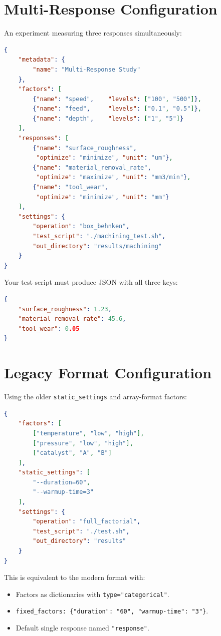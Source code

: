 \documentclass[11pt]{book}
\begin{document}
\section{Multi-Response Configuration}

An experiment measuring three responses simultaneously:

\begin{lstlisting}[language=json]
{
    "metadata": {
        "name": "Multi-Response Study"
    },
    "factors": [
        {"name": "speed",    "levels": ["100", "500"]},
        {"name": "feed",     "levels": ["0.1", "0.5"]},
        {"name": "depth",    "levels": ["1", "5"]}
    ],
    "responses": [
        {"name": "surface_roughness",
         "optimize": "minimize", "unit": "um"},
        {"name": "material_removal_rate",
         "optimize": "maximize", "unit": "mm3/min"},
        {"name": "tool_wear",
         "optimize": "minimize", "unit": "mm"}
    ],
    "settings": {
        "operation": "box_behnken",
        "test_script": "./machining_test.sh",
        "out_directory": "results/machining"
    }
}
\end{lstlisting}

Your test script must produce JSON with all three keys:

\begin{lstlisting}[language=json]
{
    "surface_roughness": 1.23,
    "material_removal_rate": 45.6,
    "tool_wear": 0.05
}
\end{lstlisting}

\section{Legacy Format Configuration}

Using the older \texttt{static\_settings} and array-format factors:

\begin{lstlisting}[language=json]
{
    "factors": [
        ["temperature", "low", "high"],
        ["pressure", "low", "high"],
        ["catalyst", "A", "B"]
    ],
    "static_settings": [
        "--duration=60",
        "--warmup-time=3"
    ],
    "settings": {
        "operation": "full_factorial",
        "test_script": "./test.sh",
        "out_directory": "results"
    }
}
\end{lstlisting}

This is equivalent to the modern format with:
\begin{itemize}[nosep]
  \item Factors as dictionaries with \texttt{type="categorical"}.
  \item \texttt{fixed\_factors: \{"duration": "60", "warmup-time": "3"\}}.
  \item Default single response named \texttt{"response"}.
\end{itemize}
\end{document}
